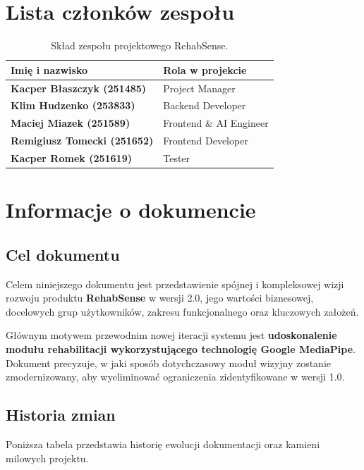 \documentclass[11pt,a4paper]{article}
\newcommand{\sysname}{\textbf{RehabSense}}
\begin{document}
\section*{Lista członków zespołu}
\begin{table}[ht]
\centering
\begin{tabularx}{0.85\textwidth}{>{\raggedright\arraybackslash\bfseries}p{6.0cm} Y}
\toprule
\textbf{Imię i nazwisko} & \textbf{Rola w projekcie} \\
\midrule
Kacper Błaszczyk (251485) & Project Manager \\
Klim Hudzenko (253833) & Backend Developer \\
Maciej Miazek (251589) & Frontend \& AI Engineer \\
Remigiusz Tomecki (251652) & Frontend Developer \\
Kacper Romek (251619) & Tester \\
\bottomrule
\end{tabularx}
\caption{Skład zespołu projektowego RehabSense.}
\end{table}

\newpage
\tableofcontents
\newpage

\section{Informacje o dokumencie}

\subsection{Cel dokumentu}
Celem niniejszego dokumentu jest przedstawienie spójnej i kompleksowej wizji rozwoju produktu \sysname{} w wersji 2.0, jego wartości biznesowej, docelowych grup użytkowników, zakresu funkcjonalnego oraz kluczowych założeń.

Głównym motywem przewodnim nowej iteracji systemu jest \textbf{udoskonalenie modułu rehabilitacji wykorzystującego technologię Google MediaPipe}. Dokument precyzuje, w jaki sposób dotychczasowy moduł wizyjny zostanie zmodernizowany, aby wyeliminować ograniczenia zidentyfikowane w wersji 1.0.

\subsection{Historia zmian}
Poniższa tabela przedstawia historię ewolucji dokumentacji oraz kamieni milowych projektu.
\end{document}
